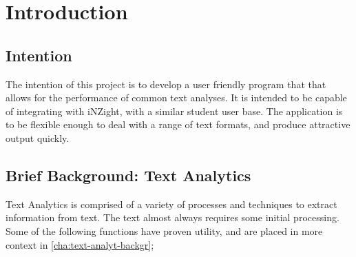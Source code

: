 \documentclass[11pt, a4paper, twoside, titlepage]{report}
\begin{document}
\tableofcontents
{}
\listoflistings{}
\listoftables
{}
\listoffigures

\chapter{Introduction}\label{cha:introduction}

\section{Intention}\label{sec:intention}

The intention of this project is to develop a user friendly program
that that allows for the performance of common text analyses. It is
intended to be capable of integrating with iNZight, with a similar
student user base. The application is to be flexible enough to deal
with a range of text formats, and produce attractive output quickly.
  
\section{Brief Background: Text Analytics}\label{sec:backgr-text-analyt}

Text Analytics is comprised of a variety of processes and techniques
to extract information from text. The text almost always requires some
initial processing. Some of the following functions have proven
utility, and are placed in more context in
\cref{cha:text-analyt-backgr};
\end{document}
